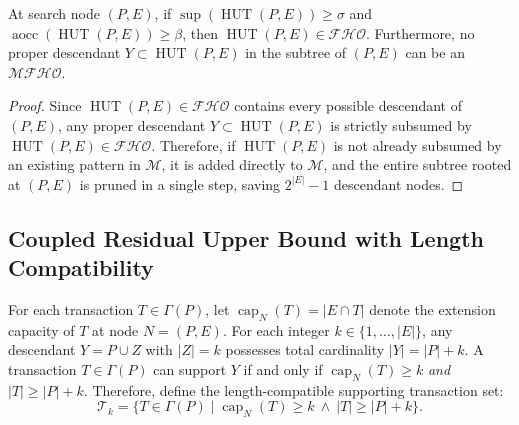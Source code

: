 \documentclass[runningheads,orivec]{llncs}
\newcommand{\supp}{\operatorname{sup}}
\newcommand{\aocc}{\operatorname{aocc}}
\newcommand{\HUT}{\operatorname{HUT}}
\newcommand{\capN}{\operatorname{cap}_N}
\newcommand{\FHO}{\ensuremath{\mathcal{FHO}}}
\newcommand{\MFHOI}{\ensuremath{\mathcal{MFHO}}}
\begin{document}
\begin{theorem}
\label{thm:hut_absorption}
At search node $(P, E)$, if $\supp(\HUT(P, E)) \ge \sigma$ and $\aocc(\HUT(P, E)) \ge \beta$, then $\HUT(P, E) \in \FHO$.
Furthermore, no proper descendant $Y \subset \HUT(P, E)$ in the subtree of $(P, E)$ can be an $\MFHOI$.
\end{theorem}
\begin{proof}
Since $\HUT(P, E) \in \FHO$ contains every possible descendant of $(P, E)$, any proper descendant $Y \subset \HUT(P, E)$ is strictly subsumed by $\HUT(P, E) \in \FHO$.
Therefore, if $\HUT(P, E)$ is not already subsumed by an existing pattern in $\mathcal{M}$, it is added directly to $\mathcal{M}$, and the entire subtree rooted at $(P, E)$ is pruned in a single step, saving $2^{|E|}-1$ descendant nodes.
\end{proof}

\subsection{Coupled Residual Upper Bound with Length Compatibility}

For each transaction $T \in \Gamma(P)$, let $\capN(T) = |E \cap T|$ denote the extension capacity of $T$ at node $N = (P, E)$.
For each integer $k \in \{1, \dots, |E|\}$, any descendant $Y = P \cup Z$ with $|Z| = k$ possesses total cardinality $|Y| = |P| + k$. A transaction $T \in \Gamma(P)$ can support $Y$ if and only if $\capN(T) \ge k$ \emph{and} $|T| \ge |P| + k$.
Therefore, define the length-compatible supporting transaction set:
\begin{equation}
\label{eq:Tk}
\mathcal{T}_k = \{T \in \Gamma(P) \mid \capN(T) \ge k \ \land \ |T| \ge |P| + k\}.
\end{equation}
\end{document}
